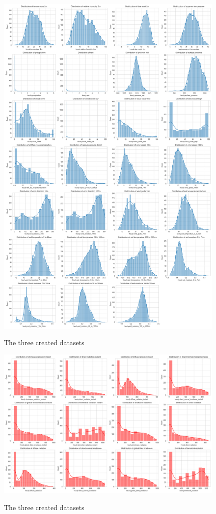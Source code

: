 \begin{figure}[H]
	\caption{The three created datasets}
	\centering
	\includegraphics[width=\textwidth]{chapter-images/5_1-eda/distribution_weather_variables1FT.png}
	\label{fig:distribuiton_weather_variables}
\end{figure}

\begin{figure}[H]
	\caption{The three created datasets}
	\centering
	\includegraphics[width=\textwidth]{chapter-images/5_1-eda/distribution_weather_variables2FT.png}
	\label{fig:distribuiton_weather_variables_radiation}
\end{figure}

